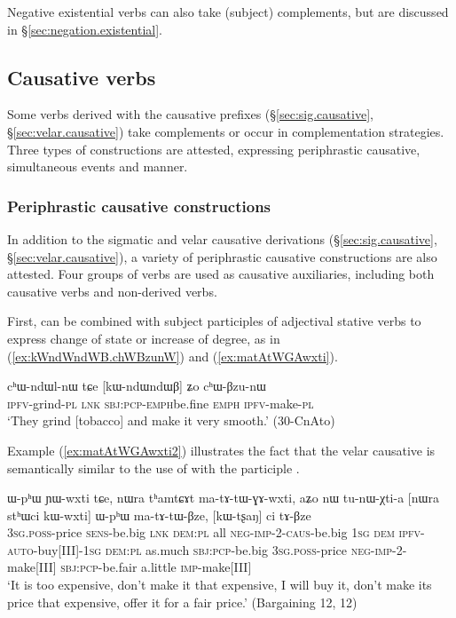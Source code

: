 Negative existential verbs can also take (subject) complements, but are discussed in §\ref{sec:negation.existential}. 

\subsection{Causative verbs}
Some verbs derived with the causative prefixes (§\ref{sec:sig.causative}, §\ref{sec:velar.causative}) take complements or occur in complementation strategies. Three types of constructions are attested, expressing periphrastic causative, simultaneous events and manner.

\subsubsection{Periphrastic causative constructions} \label{sec:sWpa.sABzu}
In addition to the sigmatic and velar causative derivations (§\ref{sec:sig.causative}, §\ref{sec:velar.causative}), a variety of periphrastic causative constructions are also attested. Four groups of verbs are used as causative auxiliaries, including both causative verbs and non-derived verbs.

First,  can be combined with subject participles of adjectival stative verbs to express change of state or increase of degree, as in (\ref{ex:kWndWndWB.chWBzunW}) and (\ref{ex:matAtWGAwxti}).

\begin{exe}
\ex  \label{ex:kWndWndWB.chWBzunW}
\gll cʰɯ-ndɯl-nɯ tɕe [kɯ-ndɯ\redp{}ndɯβ] ʑo cʰɯ-βzu-nɯ \\
\textsc{ipfv}-grind-\textsc{pl} \textsc{lnk} \textsc{sbj}:\textsc{pcp}-\textsc{emph}\redp{}be.fine \textsc{emph} \textsc{ipfv}-make-\textsc{pl} \\
\glt `They grind [tobacco] and make it very smooth.' (30-CnAto)
\end{exe}

Example (\ref{ex:matAtWGAwxti2}) illustrates the fact that the velar causative  is semantically similar to the use of  with the participle .

\begin{exe}
\ex  \label{ex:matAtWGAwxti2}
\gll  ɯ-pʰɯ ɲɯ-wxti tɕe, nɯra tʰamtɕɤt ma-tɤ-tɯ-ɣɤ-wxti, aʑo nɯ tu-nɯ-χti-a [nɯra stʰɯci kɯ-wxti] ɯ-pʰɯ ma-tɤ-tɯ-βze, [kɯ-tʂaŋ] ci tɤ-βze \\
   \textsc{3sg}.\textsc{poss}-price \textsc{sens}-be.big \textsc{lnk} \textsc{dem}:\textsc{pl} all \textsc{neg}-\textsc{imp}-2-\textsc{caus}-be.big \textsc{1sg} \textsc{dem} \textsc{ipfv}-\textsc{auto}-buy[III]-\textsc{1sg}   \textsc{dem}:\textsc{pl} as.much \textsc{sbj}:\textsc{pcp}-be.big \textsc{3sg}.\textsc{poss}-price \textsc{neg}-\textsc{imp}-2-make[III] \textsc{sbj}:\textsc{pcp}-be.fair a.little \textsc{imp}-make[III] \\
\glt `It is too expensive, don't make it that expensive, I will buy it, don't make its price that expensive, offer it for a fair price.' (Bargaining 12,  12)
\end{exe}

